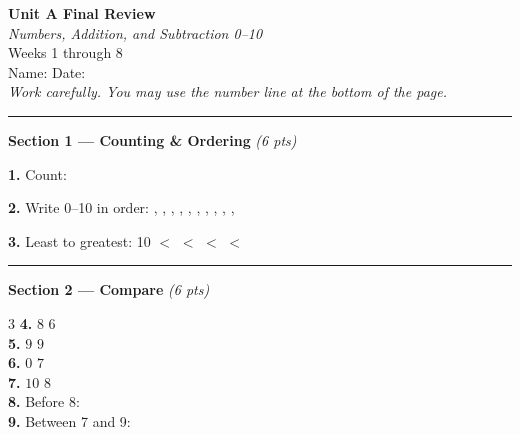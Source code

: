 \documentclass[12pt, letterpaper]{article}
\newcommand{\answerline}{\underline{\hspace{2.5cm}}}
\newcommand{\biganswerline}{\underline{\hspace{4cm}}}
\newcommand{\numbox}{\fbox{\hspace{0.6cm}\vphantom{0}}}
\newcommand{\symbox}{\fbox{\hspace{0.7cm}}}
\begin{document}
\begin{center}
  {\LARGE\textbf{\textcolor{scholared}{Unit A Final Review}}}\\[4pt]
  {\Large\textcolor{scholagold}{\textit{Numbers, Addition, and Subtraction 0–10}}}\\[6pt]
  {\large\textcolor{scholablue}{Weeks 1 through 8}}\\[6pt]
  {\small Name: \biganswerline \hspace{1cm} Date: \answerline}\\[4pt]
  {\small\textit{Work carefully. You may use the number line at the bottom of the page.}}
\end{center}

\vspace{4pt}
\noindent\textcolor{scholared}{\rule{\linewidth}{1.5pt}}
\vspace{6pt}

\noindent\textcolor{scholared}{\large\textbf{Section 1 — Counting \& Ordering}} \hfill \textit{(6 pts)}

\bigskip
\noindent\textbf{1.} Count: \;
\hfill \answerline

\noindent\textbf{2.} Write 0–10 in order: \;
\numbox , \numbox , \numbox , \numbox , \numbox , \numbox , \numbox , \numbox , \numbox , \numbox , \numbox

\noindent\textbf{3.} Least to greatest: 10     \hspace{0.5cm}
\numbox $<$ \numbox $<$ \numbox $<$ \numbox $<$ \numbox

\bigskip
\noindent\textcolor{scholared}{\rule{\linewidth}{0.4pt}}

\noindent\textcolor{scholared}{\large\textbf{Section 2 — Compare}} \hfill \textit{(6 pts)}

\bigskip
\begin{multicols}{3}
\noindent\textbf{4.} $8$ \; \symbox \; $6$ \\[12pt]
\noindent\textbf{5.} $9$ \; \symbox \; $9$ \\
\columnbreak
\noindent\textbf{6.} $0$ \; \symbox \; $7$ \\[12pt]
\noindent\textbf{7.} $10$ \; \symbox \; $8$ \\
\columnbreak
\noindent\textbf{8.} Before 8: \answerline \\[12pt]
\noindent\textbf{9.} Between 7 and 9: \answerline
\end{multicols}
\end{document}
